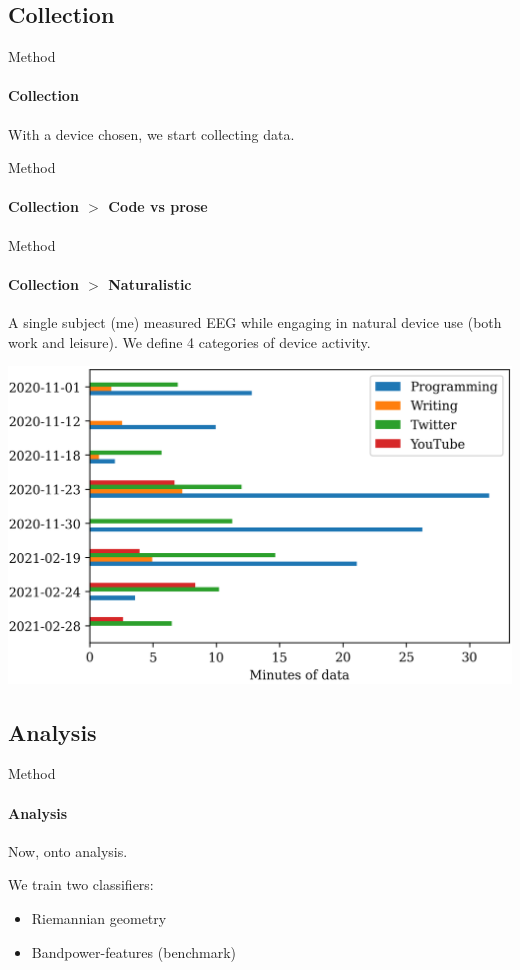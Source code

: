 \documentclass[xcolor={dvipsnames,table},12pt]{beamer}
\begin{document}
\subsection{Collection}
\begin{frame}{Method}
    \framesubtitle{Collection}

    With a device chosen, we start collecting data.
\end{frame}

\begin{frame}{Method}
    \framesubtitle{Collection $>$ Code vs prose}
    {
        \small
        
    }
\end{frame}

\begin{frame}{Method}
    \framesubtitle{Collection $>$ Naturalistic}
    A single subject (me) measured EEG while engaging in natural device use (both work and leisure). We define 4 categories of device activity.

    \begin{adjustbox}{width=0.7\textwidth,center,float=table}
        \includegraphics{img/naturalistic-dayclass-dist.png}
    \end{adjustbox}
\end{frame}

\subsection{Analysis}
\begin{frame}{Method}
    \framesubtitle{Analysis}

    Now, onto analysis.

    We train two classifiers:
    \begin{itemize}
        \item Riemannian geometry
        \item Bandpower-features (benchmark)
    \end{itemize}
\end{frame}
\end{document}
